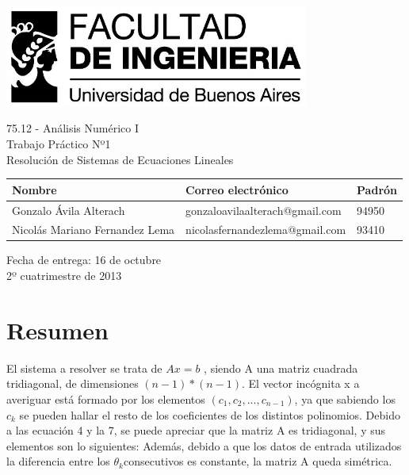 \documentclass[12pt,spanish]{article}
\begin{document}
\chead{}

\begin{titlepage}
\thispagestyle{empty} %

\begin{center}
	\includegraphics[width=10cm]{logo-facu-grande.jpg}
	\vfill
	
	\huge{75.12 - Análisis Numérico I} \\
	\LARGE{Trabajo Práctico Nº1 \\ Resolución de Sistemas de Ecuaciones Lineales}
	\vfill
	
	\normalsize{
	\begin{tabular}{lll}
		\textbf{Nombre} & \textbf{Correo electrónico} & \textbf{Padrón} \\ \hline 
		Gonzalo Ávila Alterach & gonzaloavilaalterach@gmail.com & 94950 \\
		Nicolás Mariano Fernandez Lema & nicolasfernandezlema@gmail.com & 93410 \\
	\end{tabular}
	}
	\vfill
		
	\large{Fecha de entrega: 16 de octubre \\ 2º cuatrimestre de 2013}
	\vfill
\end{center}
\end{titlepage}
\pagebreak

\section{Resumen}
El sistema a resolver se trata de $Ax=b$ , siendo A una matriz cuadrada tridiagonal, de dimensiones $(n-1)*(n-1)$.
El vector incógnita x a averiguar está formado por los elementos $(c_1, c_2, ..., c_{n-1})$, ya que sabiendo los $c_k$ se pueden hallar el resto de los coeficientes de los distintos polinomios.
Debido a las ecuación 4 y la 7, se puede apreciar que la matriz A es tridiagonal, y sus elementos son lo siguientes:
Además, debido a que los datos de entrada utilizados la diferencia entre los $\theta _k$consecutivos es constante, la matriz A queda simétrica.
\end{document}
